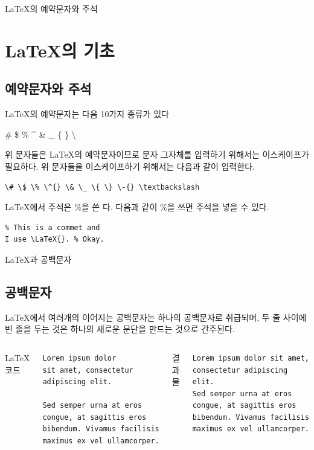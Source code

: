 \documentclass{beamer}
\begin{document}
\begin{frame}[fragile]{\LaTeX{}의 예약문자와 주석}
    \section{\LaTeX{}의 기초}
    \subsection{예약문자와 주석}
    \LaTeX{}의 예약문자는 다음 10가지 종류가 있다
    
    \# \$ \% \^{} \& \_ \{ \} \-{} \textbackslash

    \bigskip

    위 문자들은 \LaTeX{}의 예약문자이므로 문자 그자체를 입력하기 위해서는 이스케이프가 필요하다. 위 문자들을 이스케이프하기 위해서는 다음과 같이 입력한다.

    \begin{lstlisting}
\# \$ \% \^{} \& \_ \{ \} \-{} \textbackslash
    \end{lstlisting}

    \LaTeX{}에서 주석은 \%을 쓴 다. 다음과 같이 \%을 쓰면 주석을 넣을 수 있다.
    \begin{lstlisting}
% This is a commet and
I use \LaTeX{}. % Okay.
    \end{lstlisting}
\end{frame}

\begin{frame}[fragile]{\LaTeX{}과 공백문자}
    \subsection{공백문자}
    \LaTeX{}에서 여러개의 이어지는 공백문자는 하나의 공백문자로 취급되며, 두 줄 사이에 빈 줄을 두는 것은 하나의 새로운 문단을 만드는 것으로 간주된다.
    \medskip
    \begin{columns}[t]
        \LaTeX{} 코드
        \begin{lstlisting}
Lorem ipsum dolor                 sit amet, consectetur adipiscing elit.

Sed semper urna at eros congue, at sagittis eros bibendum. Vivamus facilisis maximus ex vel ullamcorper.
        \end{lstlisting}

        결과물
        \begin{lstlisting}[language={}]
Lorem ipsum dolor sit amet, consectetur adipiscing elit.
Sed semper urna at eros congue, at sagittis eros bibendum. Vivamus facilisis maximus ex vel ullamcorper.
        \end{lstlisting}
    \end{columns}
\end{frame}
\end{document}

